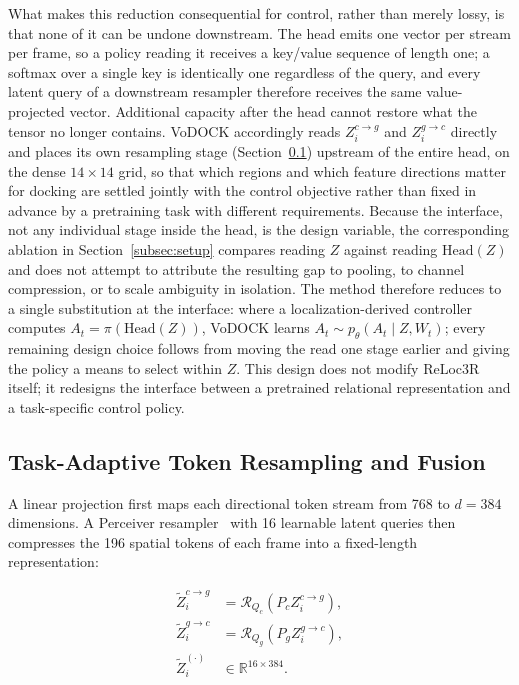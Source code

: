 \documentclass[letterpaper, 10 pt, conference]{IEEEtran}  %
\begin{document}
What makes this reduction consequential for control, rather than merely lossy, is that none of it can be undone downstream. The head emits one vector per stream per frame, so a policy reading it receives a key/value sequence of length one; a softmax over a single key is identically one regardless of the query, and every latent query of a downstream resampler therefore receives the same value-projected vector. Additional capacity after the head cannot restore what the tensor no longer contains. VoDOCK accordingly reads $Z_i^{c\rightarrow g}$ and $Z_i^{g\rightarrow c}$ directly and places its own resampling stage (Section~\ref{subsec:token_fusion}) upstream of the entire head, on the dense $14\times14$ grid, so that which regions and which feature directions matter for docking are settled jointly with the control objective rather than fixed in advance by a pretraining task with different requirements. Because the interface, not any individual stage inside the head, is the design variable, the corresponding ablation in Section~\ref{subsec:setup} compares reading $Z$ against reading $\mathrm{Head}(Z)$ and does not attempt to attribute the resulting gap to pooling, to channel compression, or to scale ambiguity in isolation. The method therefore reduces to a single substitution at the interface: where a localization-derived controller computes $A_t=\pi\!\left(\mathrm{Head}(Z)\right)$, VoDOCK learns $A_t\sim p_\theta\!\left(A_t\mid Z,W_t\right)$; every remaining design choice follows from moving the read one stage earlier and giving the policy a means to select within $Z$. This design does not modify ReLoc3R itself; it redesigns the interface between a pretrained relational representation and a task-specific control policy.

\subsection{Task-Adaptive Token Resampling and Fusion}
\label{subsec:token_fusion}

A linear projection first maps each directional token stream from 768 to $d=384$ dimensions. A Perceiver resampler~\cite{jaegle2021perceiver} with 16 learnable latent queries then compresses the 196 spatial tokens of each frame into a fixed-length representation:


\begin{equation}
\begin{aligned}
\widetilde{Z}_i^{c\rightarrow g}
    &=\mathcal{R}_{Q_c}\!\left(P_c Z_i^{c\rightarrow g}\right),\\
\widetilde{Z}_i^{g\rightarrow c}
    &=\mathcal{R}_{Q_g}\!\left(P_g Z_i^{g\rightarrow c}\right),\\
\widetilde{Z}_i^{(\cdot)}
    &\in\mathbb{R}^{16\times384}.
\end{aligned}
\end{equation}
\end{document}
